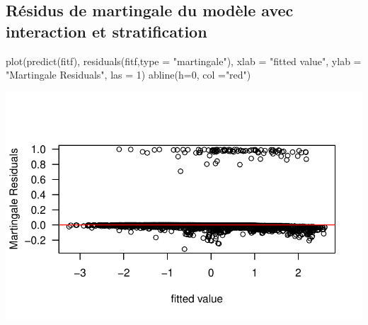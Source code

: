 \documentclass[
  letterpaper,
  DIV=11,
  numbers=noendperiod]{scrartcl}
\newenvironment{Shaded}{\begin{snugshade}}{\end{snugshade}}
\newcommand{\AttributeTok}[1]{\textcolor[rgb]{0.40,0.45,0.13}{#1}}
\newcommand{\DecValTok}[1]{\textcolor[rgb]{0.68,0.00,0.00}{#1}}
\newcommand{\FunctionTok}[1]{\textcolor[rgb]{0.28,0.35,0.67}{#1}}
\newcommand{\NormalTok}[1]{\textcolor[rgb]{0.00,0.23,0.31}{#1}}
\newcommand{\StringTok}[1]{\textcolor[rgb]{0.13,0.47,0.30}{#1}}
\begin{document}
\subsection{Résidus de martingale du modèle avec interaction et
stratification}\label{ruxe9sidus-de-martingale-du-moduxe8le-avec-interaction-et-stratification}

\begin{Shaded}
\begin{Highlighting}[]
\FunctionTok{plot}\NormalTok{(}\FunctionTok{predict}\NormalTok{(fitf), }\FunctionTok{residuals}\NormalTok{(fitf,}\AttributeTok{type =} \StringTok{"martingale"}\NormalTok{),}
     \AttributeTok{xlab =} \StringTok{"fitted value"}\NormalTok{, }\AttributeTok{ylab =} \StringTok{"Martingale Residuals"}\NormalTok{, }\AttributeTok{las =} \DecValTok{1}\NormalTok{)}
\FunctionTok{abline}\NormalTok{(}\AttributeTok{h=}\DecValTok{0}\NormalTok{, }\AttributeTok{col =}\StringTok{"red"}\NormalTok{)}
\end{Highlighting}
\end{Shaded}

\includegraphics{Rapport-technique_files/figure-pdf/unnamed-chunk-7-1.pdf}
\end{document}
